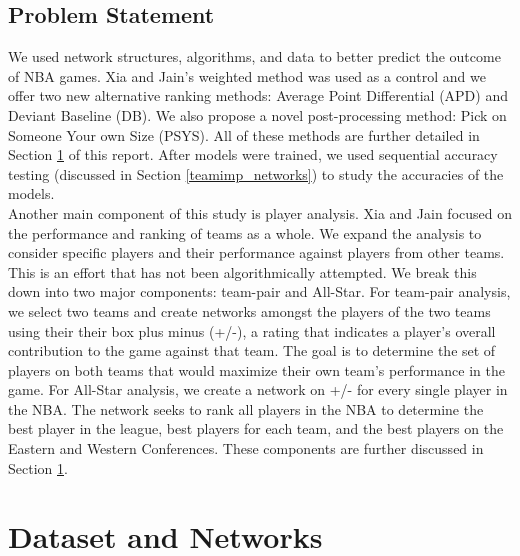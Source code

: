 \documentclass[12pt]{article}%
\begin{document}
\subsection{Problem Statement}
\label{sec:1.2}
\null\quad\quad We used network structures, algorithms, and data to better predict the outcome of NBA games. Xia and Jain's weighted method was used as a control and we offer two new alternative ranking methods: Average Point Differential (APD) and Deviant Baseline (DB). We also propose a novel post-processing method: Pick on Someone Your own Size (PSYS). All of these methods are further detailed in Section \ref{sec:2} of this report. After models were trained, we used sequential accuracy testing (discussed in Section \ref{teamimp_networks}) to study the accuracies of the models.\\
\null\quad\quad Another main component of this study is player analysis. Xia and Jain focused on the performance and ranking of teams as a whole. We expand the analysis to consider specific players and their performance against players from other teams. This is an effort that has not been algorithmically attempted. We break this down into two major components: team-pair and All-Star. For team-pair analysis, we select two teams and create networks amongst the players of the two teams using their their box plus minus (+/-), a rating that indicates a player's overall contribution to the game against that team. The goal is to determine the set of players on both teams that would maximize their own team's performance in the game. For All-Star analysis, we create a network on +/- for every single player in the NBA. The network seeks to rank all players in the NBA to determine the best player in the league, best players for each team, and the best players on the Eastern and Western Conferences. These components are further discussed in Section \ref{sec:2}.

\section{Dataset and Networks}
\label{sec:2}
\end{document}
